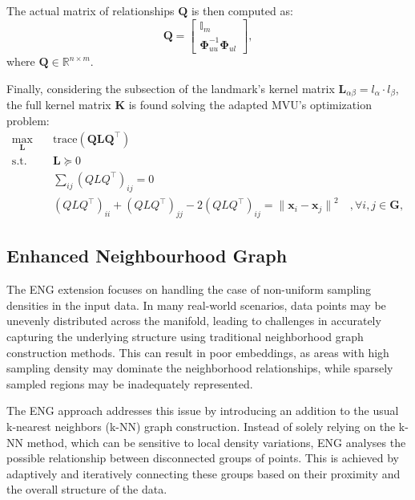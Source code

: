             The actual matrix of relationships $\boldsymbol{Q}$ is then computed as:
            \begin{equation}
                \boldsymbol{Q} = 
                \begin{bmatrix}
                    \boldsymbol{\mathbb{I}}_m \\
                    \boldsymbol{\Phi}_{uu}^{-1} \boldsymbol{\Phi}_{ul}
                \end{bmatrix},
            \end{equation}
            where $\boldsymbol{Q} \in \mathbb{R}^{n \times m}$.
            

            Finally, considering the subsection of the landmark's kernel matrix $\boldsymbol{L}_{\alpha \beta} = l_\alpha \cdot l_\beta$, the full kernel matrix $\boldsymbol{K}$ is found solving the adapted \ac{MVU}'s optimization problem:
            \begin{align}
                \max_{\boldsymbol{L}} \quad & \text{trace}(\boldsymbol{QLQ^\top}) \\
                \textrm{s.t.} \quad 
                & \boldsymbol{L} \succeq 0 \\
                & \sum_{ij} (QLQ^\top)_{ij} = 0 \\
                & (QLQ^\top)_{ii} + (QLQ^\top)_{jj} -2(QLQ^\top)_{ij} = {\| \boldsymbol{x}_i - \boldsymbol{x}_j \|}^2 \quad , \forall{i,j}\in \boldsymbol{G},
            \end{align}



    \subsection{Enhanced Neighbourhood Graph}

    The \ac{ENG} \cite{eng} extension focuses on handling the case of non-uniform sampling densities in the input data. In many real-world scenarios, data points may be unevenly distributed across the manifold, leading to challenges in accurately capturing the underlying structure using traditional neighborhood graph construction methods. This can result in poor embeddings, as areas with high sampling density may dominate the neighborhood relationships, while sparsely sampled regions may be inadequately represented.

    The \ac{ENG} approach addresses this issue by introducing an addition to the usual k-nearest neighbors (k-NN) graph construction. Instead of solely relying on the k-NN method, which can be sensitive to local density variations, \ac{ENG} analyses the possible relationship between disconnected groups of points. This is achieved by adaptively and iteratively connecting these groups based on their proximity and the overall structure of the data.

